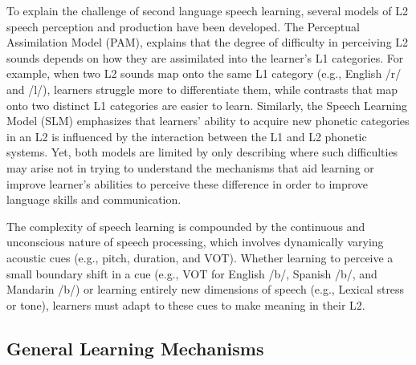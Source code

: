 To explain the challenge of second language speech learning, several models of L2 speech perception and production have been developed. The Perceptual Assimilation Model (PAM), explains that the degree of difficulty in perceiving L2 sounds depends on how they are assimilated into the learner’s L1 categories. For example, when two L2 sounds map onto the same L1 category (e.g., English /r/ and /l/), learners struggle more to differentiate them, while contrasts that map onto two distinct L1 categories are easier to learn. Similarly, the Speech Learning Model (SLM) emphasizes that learners’ ability to acquire new phonetic categories in an L2 is influenced by the interaction between the L1 and L2 phonetic systems. Yet, both models are limited by only describing where such difficulties may arise not in trying to understand the mechanisms that aid learning or improve learner's abilities to perceive these difference in order to improve language skills and communication.

The complexity of speech learning is compounded by the continuous and unconscious nature of speech processing, which involves dynamically varying acoustic cues (e.g., pitch, duration, and VOT). Whether learning to perceive a small boundary shift in a cue (e.g., VOT for English /b/, Spanish /b/, and Mandarin /b/) or learning entirely new dimensions of speech (e.g., Lexical stress or tone), learners must adapt to these cues to make meaning in their L2.

\subsection{General Learning Mechanisms}

